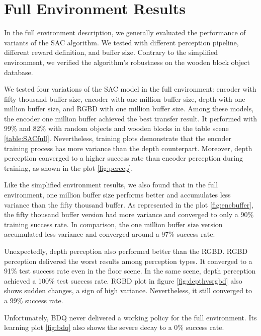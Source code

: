 \section{Full Environment Results}


In the full environment description, we generally evaluated the performance of variants of the SAC algorithm. We tested with different perception pipeline, different reward definition, and buffer size. Contrary to the simplified environment, we verified the algorithm's robustness on the wooden block object database.

We tested four variations of the SAC model in the full environment: encoder with fifty thousand buffer size, encoder with one million buffer size, depth with one million buffer size, and RGBD with one million buffer size. Among these models, the encoder one million buffer achieved the best transfer result. It performed with 99\% and 82\% with random objects and wooden blocks in the table scene \ref{table:SACfull}. Nevertheless, training plots demonstrate that the encoder training process has more variance than the depth counterpart. Moreover, depth perception converged to a higher success rate than encoder perception during training, as shown in the plot \ref{fig:percep}.

Like the simplified environment results, we also found that in the full environment, one million buffer size performs better and accumulates less variance than the fifty thousand buffer. As represented in the plot \ref{fig:encbuffer}, the fifty thousand buffer version had more variance and converged to only a 90\% training success rate. In comparison, the one million buffer size version accumulated less variance and converged around a 97\% success rate.  

Unexpectedly, depth perception also performed better than the RGBD. RGBD perception delivered the worst results among perception types. It converged to a 91\% test success rate even in the floor scene. In the same scene, depth perception achieved a 100\% test success rate. RGBD plot in figure \ref{fig:depthvsrgbd} also shows sudden changes, a sign of high variance. Nevertheless, it still converged to a 99\% success rate.

Unfortunately, BDQ never delivered a working policy for the full environment. Its learning plot \ref{fig:bdq} also shows the severe decay to a 0\% success rate.

